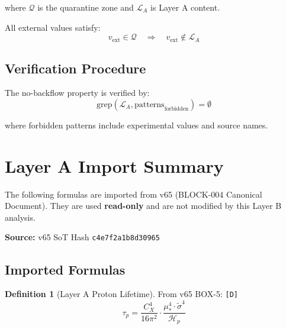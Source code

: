 \documentclass[11pt,a4paper]{article}
\newcommand{\tagD}{\textcolor{green!50!black}{\texttt{[D]}}}
\theoremstyle{definition}
\newtheorem{definition}{Definition}[section]
\begin{document}
where $\mathcal{Q}$ is the quarantine zone and $\mathcal{L}_A$ is Layer A content.

All external values satisfy:
\begin{equation}
\label{eq:external-confined}
v_{\text{ext}} \in \mathcal{Q} \quad \Rightarrow \quad v_{\text{ext}} \notin \mathcal{L}_A
\end{equation}

\subsection{Verification Procedure}
\label{subsec:verification}

The no-backflow property is verified by:
\begin{equation}
\label{eq:grep-verify}
\text{grep}(\mathcal{L}_A, \text{patterns}_{\text{forbidden}}) = \emptyset
\end{equation}

where forbidden patterns include experimental values and source names.

\section{Layer A Import Summary}
\label{sec:layer-a-import}


\begin{layerabox}
The following formulas are imported from v65 (BLOCK-004 Canonical Document).
They are used \textbf{read-only} and are not modified by this Layer B analysis.

\textbf{Source:} v65 SoT Hash \texttt{c4e7f2a1b8d30965}
\end{layerabox}

\subsection{Imported Formulas}
\label{subsec:imported-formulas}

\begin{definition}[Layer A Proton Lifetime]
\label{def:tau-p-import}
From v65 BOX-5: \tagD{}
\begin{equation}
\label{eq:tau-p-layera}
\boxed{\tau_p = \frac{C_X^4}{16\pi^2} \cdot \frac{\mu_*^4 \cdot \tilde{\sigma}^4}{\mathcal{H}_p}}
\end{equation}
\end{definition}
\end{document}
